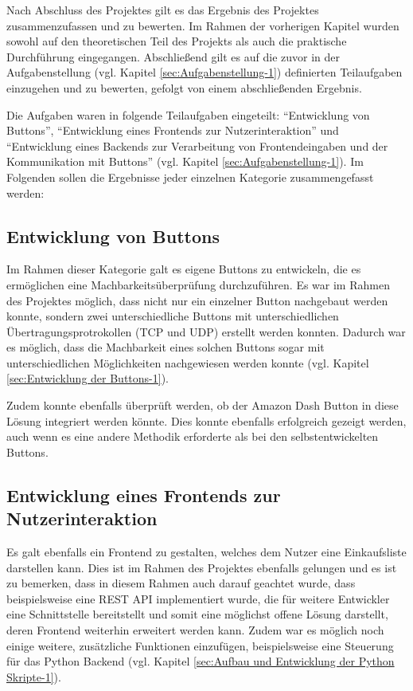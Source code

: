 Nach Abschluss des Projektes gilt es das Ergebnis des Projektes zusammenzufassen und zu bewerten. Im Rahmen der vorherigen Kapitel wurden sowohl auf den theoretischen Teil des Projekts als auch die praktische Durchführung eingegangen. Abschließend gilt es auf die zuvor in der Aufgabenstellung (vgl. Kapitel \ref{sec:Aufgabenstellung-1}) definierten Teilaufgaben einzugehen und zu bewerten, gefolgt von einem abschließenden Ergebnis. 

Die Aufgaben waren in folgende Teilaufgaben eingeteilt: ``Entwicklung von Buttons'', ``Entwicklung eines Frontends zur Nutzerinteraktion'' und ``Entwicklung eines Backends zur Verarbeitung von Frontendeingaben und der Kommunikation mit Buttons'' (vgl. Kapitel \ref{sec:Aufgabenstellung-1}). Im Folgenden sollen die Ergebnisse jeder einzelnen Kategorie zusammengefasst werden:

\subsection{Entwicklung von Buttons}
\label{sec:ErgebnisButtons}
Im Rahmen dieser Kategorie galt es eigene Buttons zu entwickeln, die es ermöglichen eine Machbarkeitsüberprüfung durchzuführen. Es war im Rahmen des Projektes möglich, dass nicht nur ein einzelner Button nachgebaut werden konnte, sondern zwei unterschiedliche Buttons mit unterschiedlichen Übertragungsprotrokollen (\ac{TCP} und \ac{UDP}) erstellt werden konnten. Dadurch war es möglich, dass die Machbarkeit eines solchen Buttons sogar mit unterschiedlichen Möglichkeiten nachgewiesen werden konnte (vgl. Kapitel \ref{sec:Entwicklung der Buttons-1}).

Zudem konnte ebenfalls überprüft werden, ob der Amazon Dash Button in diese Lösung integriert werden könnte. Dies konnte ebenfalls erfolgreich gezeigt werden, auch wenn es eine andere Methodik erforderte als bei den selbstentwickelten Buttons.

\subsection{Entwicklung eines Frontends zur Nutzerinteraktion}
\label{sec:ErgebnisFrontend}
Es galt ebenfalls ein Frontend zu gestalten, welches dem Nutzer eine Einkaufsliste darstellen kann. Dies ist im Rahmen des Projektes ebenfalls gelungen und es ist zu bemerken, dass in diesem Rahmen auch darauf geachtet wurde, dass beispielsweise eine \ac{REST} \ac{API} implementiert wurde, die für weitere Entwickler eine Schnittstelle bereitstellt und somit eine möglichst offene Lösung darstellt, deren Frontend weiterhin erweitert werden kann. Zudem war es möglich noch einige weitere, zusätzliche Funktionen einzufügen, beispielsweise eine Steuerung für das Python Backend (vgl. Kapitel \ref{sec:Aufbau und Entwicklung der Python Skripte-1}). 

